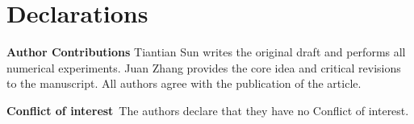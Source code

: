 \documentclass[preprint,review,sort&compress,3p]{elsarticle}
\begin{document}
\section*{Declarations}
	\textbf{Author Contributions}  Tiantian Sun writes the original draft and performs all numerical experiments. Juan Zhang provides the core idea and critical revisions to the manuscript. All authors agree with the publication of the article.

	 \textbf{Conflict of interest}~The authors declare that they have no Conflict of interest.
	 
	 




\end{document}
